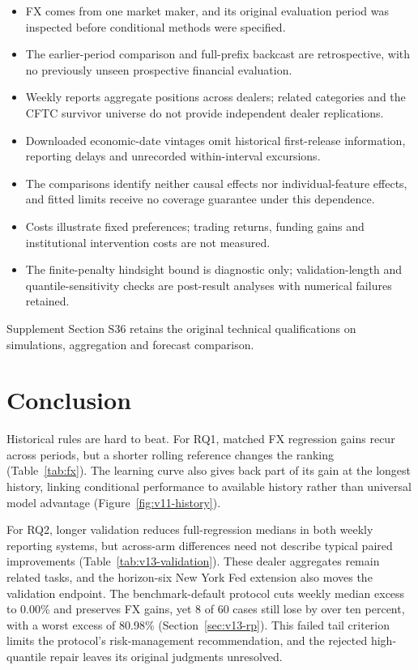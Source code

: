 \documentclass[11pt,a4paper]{article}
\begin{document}
\begin{itemize}\setlength{\itemsep}{0pt}\setlength{\parskip}{0pt}
\item FX comes from one market maker, and its original evaluation period was inspected before conditional methods were specified.
\item The earlier-period comparison and full-prefix backcast are retrospective, with no previously unseen prospective financial evaluation.
\item Weekly reports aggregate positions across dealers; related categories and the CFTC survivor universe do not provide independent dealer replications.
\item Downloaded economic-date vintages omit historical first-release information, reporting delays and unrecorded within-interval excursions.
\item The comparisons identify neither causal effects nor individual-feature effects, and fitted limits receive no coverage guarantee under this dependence.
\item Costs illustrate fixed preferences; trading returns, funding gains and institutional intervention costs are not measured.
\item The finite-penalty hindsight bound is diagnostic only; validation-length and quantile-sensitivity checks are post-result analyses with numerical failures retained.
\end{itemize}
Supplement Section S36 retains the original technical qualifications on simulations, aggregation and forecast comparison.

\FloatBarrier

\section{Conclusion}\label{sec:conclusion}

Historical rules are hard to beat. For RQ1, matched FX regression gains recur across periods, but a shorter rolling reference changes the ranking (Table~\ref{tab:fx}). The learning curve also gives back part of its gain at the longest history, linking conditional performance to available history rather than universal model advantage (Figure~\ref{fig:v11-history}).

For RQ2, longer validation reduces full-regression medians in both weekly reporting systems, but across-arm differences need not describe typical paired improvements (Table~\ref{tab:v13-validation}). These dealer aggregates remain related tasks, and the horizon-six New York Fed extension also moves the validation endpoint. The benchmark-default protocol cuts weekly median excess to 0.00\% and preserves FX gains, yet 8 of 60 cases still lose by over ten percent, with a worst excess of 80.98\% (Section~\ref{sec:v13-rp}). This failed tail criterion limits the protocol's risk-management recommendation, and the rejected high-quantile repair leaves its original judgments unresolved.
\end{document}
